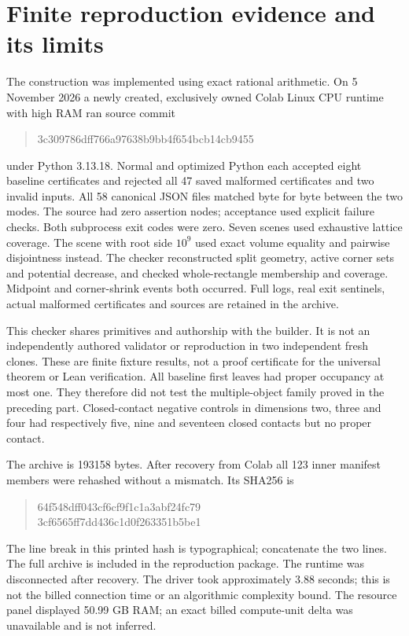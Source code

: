 \documentclass[11pt,a4paper]{article}
\begin{document}
\section{Finite reproduction evidence and its limits}
The construction was implemented using exact rational arithmetic. On
5 November 2026 a newly created, exclusively owned Colab Linux CPU runtime
with high RAM ran source commit
\begin{quote}\small\ttfamily
3c309786dff766a97638b9bb4f654bcb14cb9455
\end{quote}
under Python 3.13.18. Normal and optimized Python each accepted eight
baseline certificates and rejected all 47 saved malformed certificates
and two invalid inputs. All 58 canonical JSON files matched byte for byte
between the two modes. The source had zero assertion nodes; acceptance
used explicit failure checks. Both subprocess exit codes were zero.
Seven scenes used exhaustive lattice coverage. The scene with root side
$10^9$ used exact volume equality and pairwise disjointness instead.
The checker reconstructed split geometry, active corner sets and potential
decrease, and checked whole-rectangle membership and coverage. Midpoint
and corner-shrink events both occurred. Full logs, real exit sentinels,
actual malformed certificates and sources are retained in the archive.

This checker shares primitives and authorship with the builder. It is not
an independently authored validator or reproduction in two independent
fresh clones. These are finite fixture results, not a proof certificate
for the universal theorem or Lean verification. All baseline first leaves
had proper occupancy at most one. They therefore did not test the
multiple-object family proved in the preceding part. Closed-contact
negative controls in dimensions two, three and four had respectively
five, nine and seventeen closed contacts but no proper contact.

The archive is 193158 bytes. After recovery from Colab all 123 inner
manifest members were rehashed without a mismatch. Its SHA256 is
\begin{quote}\small\ttfamily
64f548dff043cf6cf9f1c1a3abf24fc79\\
3cf6565ff7dd436c1d0f263351b5be1
\end{quote}
The line break in this printed hash is typographical; concatenate the two
lines. The full archive is included in the reproduction package. The
runtime was disconnected after recovery. The driver took approximately
3.88 seconds; this is not the billed connection time or an algorithmic
complexity bound. The resource panel displayed 50.99 GB RAM; an exact
billed compute-unit delta was unavailable and is not inferred.
\end{document}
